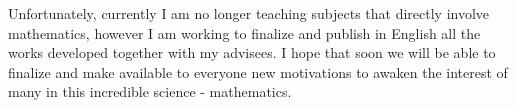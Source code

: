 \documentclass{book}
\begin{document}
Unfortunately, currently I am no longer teaching subjects that directly involve mathematics, however I am working to finalize and publish in English all the works developed together with my advisees. I hope that soon we will be able to finalize and make available to everyone new motivations to awaken the interest of many in this incredible science - mathematics. 




\end{document}
